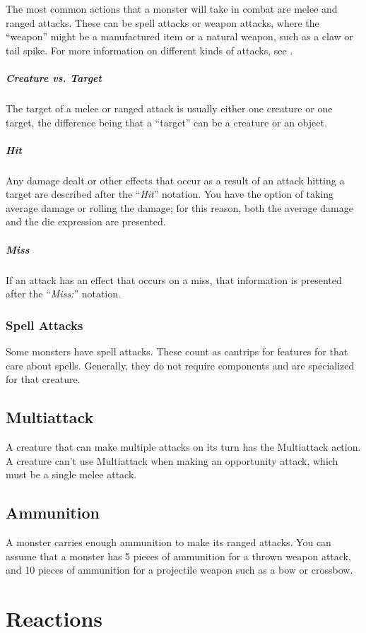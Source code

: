 The most common actions that a monster will take in combat are melee and ranged attacks. These can be spell attacks or weapon attacks, where the “weapon” might be a manufactured item or a natural weapon, such as a claw or tail spike. For more information on different kinds of attacks, see .

\subparagraph*{Creature vs. Target} The target of a melee or ranged attack is usually either one creature or one target, the difference being that a “target” can be a creature or an object.

\subparagraph*{Hit} Any damage dealt or other effects that occur as a result of an attack hitting a target are described after the “\textit{Hit}” notation. You have the option of taking average damage or rolling the damage; for this reason, both the average damage and the die expression are presented.

\subparagraph*{Miss} If an attack has an effect that occurs on a miss, that information is presented after the “\textit{Miss:}” notation.

\subsubsection{Spell Attacks}

Some monsters have spell attacks. These count as cantrips for features for that care about spells. Generally, they do not require components and are specialized for that creature. 

\subsection{Multiattack}

A creature that can make multiple attacks on its turn has the Multiattack action. A creature can't use Multiattack when making an opportunity attack, which must be a single melee attack.

\subsection{Ammunition}

A monster carries enough ammunition to make its ranged attacks. You can assume that a monster has 5 pieces of ammunition for a thrown weapon attack, and 10 pieces of ammunition for a projectile weapon such as a bow or crossbow.

\section{Reactions}

